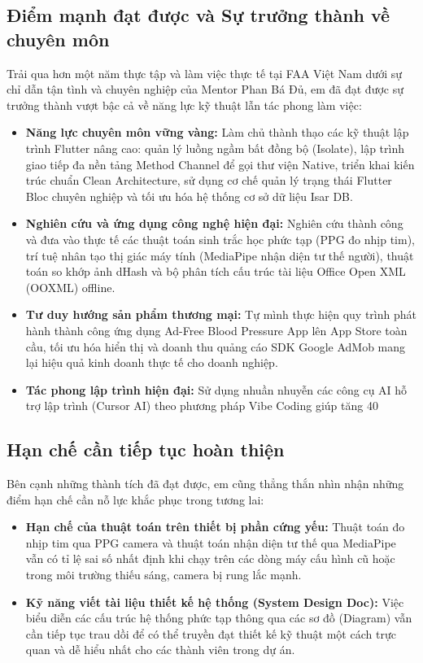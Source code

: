 \documentclass[12pt, a4paper]{article}
\begin{document}
\subsection{Điểm mạnh đạt được và Sự trưởng thành về chuyên môn}
Trải qua hơn một năm thực tập và làm việc thực tế tại FAA Việt Nam dưới sự chỉ dẫn tận tình và chuyên nghiệp của Mentor Phan Bá Đủ, em đã đạt được sự trưởng thành vượt bậc cả về năng lực kỹ thuật lẫn tác phong làm việc:
\begin{itemize}
    \item \textbf{Năng lực chuyên môn vững vàng:} Làm chủ thành thạo các kỹ thuật lập trình Flutter nâng cao: quản lý luồng ngầm bất đồng bộ (Isolate), lập trình giao tiếp đa nền tảng Method Channel để gọi thư viện Native, triển khai kiến trúc chuẩn Clean Architecture, sử dụng cơ chế quản lý trạng thái Flutter Bloc chuyên nghiệp và tối ưu hóa hệ thống cơ sở dữ liệu Isar DB.
    \item \textbf{Nghiên cứu và ứng dụng công nghệ hiện đại:} Nghiên cứu thành công và đưa vào thực tế các thuật toán sinh trắc học phức tạp (PPG đo nhịp tim), trí tuệ nhân tạo thị giác máy tính (MediaPipe nhận diện tư thế người), thuật toán so khớp ảnh dHash và bộ phân tích cấu trúc tài liệu Office Open XML (OOXML) offline.
    \item \textbf{Tư duy hướng sản phẩm thương mại:} Tự mình thực hiện quy trình phát hành thành công ứng dụng Ad-Free Blood Pressure App lên App Store toàn cầu, tối ưu hóa hiển thị và doanh thu quảng cáo SDK Google AdMob mang lại hiệu quả kinh doanh thực tế cho doanh nghiệp.
    \item \textbf{Tác phong lập trình hiện đại:} Sử dụng nhuần nhuyễn các công cụ AI hỗ trợ lập trình (Cursor AI) theo phương pháp Vibe Coding giúp tăng 40%
\end{itemize}

\subsection{Hạn chế cần tiếp tục hoàn thiện}
Bên cạnh những thành tích đã đạt được, em cũng thẳng thắn nhìn nhận những điểm hạn chế cần nỗ lực khắc phục trong tương lai:
\begin{itemize}
    \item \textbf{Hạn chế của thuật toán trên thiết bị phần cứng yếu:} Thuật toán đo nhịp tim qua PPG camera và thuật toán nhận diện tư thế qua MediaPipe vẫn có tỉ lệ sai số nhất định khi chạy trên các dòng máy cấu hình cũ hoặc trong môi trường thiếu sáng, camera bị rung lắc mạnh.
    \item \textbf{Kỹ năng viết tài liệu thiết kế hệ thống (System Design Doc):} Việc biểu diễn các cấu trúc hệ thống phức tạp thông qua các sơ đồ (Diagram) vẫn cần tiếp tục trau dồi để có thể truyền đạt thiết kế kỹ thuật một cách trực quan và dễ hiểu nhất cho các thành viên trong dự án.
\end{itemize}
\end{document}
